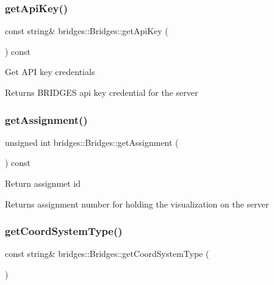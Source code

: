 \subsubsection{\texorpdfstring{get\+Api\+Key()}{getApiKey()}}
{\footnotesize\ttfamily const string\& bridges\+::\+Bridges\+::get\+Api\+Key (\begin{DoxyParamCaption}{ }\end{DoxyParamCaption}) const\hspace{0.3cm}{\ttfamily [inline]}}

Get A\+PI key credentials \begin{DoxyReturn}{Returns}
B\+R\+I\+D\+G\+ES api key credential for the server 
\end{DoxyReturn}
\mbox{\label{classbridges_1_1_bridges_aa45b4ba781b5cbecc8cb04c76dfd527a}} 
\subsubsection{\texorpdfstring{get\+Assignment()}{getAssignment()}}
{\footnotesize\ttfamily unsigned int bridges\+::\+Bridges\+::get\+Assignment (\begin{DoxyParamCaption}{ }\end{DoxyParamCaption}) const\hspace{0.3cm}{\ttfamily [inline]}}

Return assignmet id

\begin{DoxyReturn}{Returns}
assignment number for holding the visualization on the server 
\end{DoxyReturn}
\mbox{\label{classbridges_1_1_bridges_aac3cdb607177ff537f5160c3790d814a}} 
\subsubsection{\texorpdfstring{get\+Coord\+System\+Type()}{getCoordSystemType()}}
{\footnotesize\ttfamily const string\& bridges\+::\+Bridges\+::get\+Coord\+System\+Type (\begin{DoxyParamCaption}{ }\end{DoxyParamCaption})\hspace{0.3cm}{\ttfamily [inline]}}

